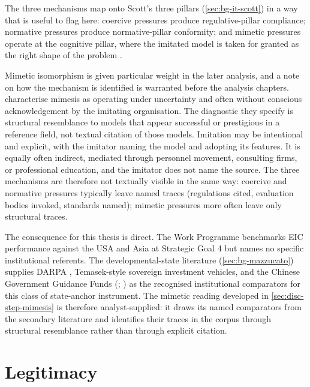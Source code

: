 The three mechanisms map onto Scott's three pillars
(\cref{sec:bg-it-scott}) in a way that is useful to flag here:
coercive pressures produce regulative-pillar compliance; normative
pressures produce normative-pillar conformity; and mimetic pressures
operate at the cognitive pillar, where the imitated model is taken
for granted as the right shape of the problem
\parencite{scott2014institutions}.

Mimetic isomorphism is given particular weight in the later analysis,
and a note on how the mechanism is identified is warranted before the
analysis chapters. \textcite{dimaggio1983iron} characterise mimesis as
operating under uncertainty and often without conscious acknowledgement
by the imitating organisation. The diagnostic they specify is
structural resemblance to models that appear successful or prestigious
in a reference field, not textual citation of those models. Imitation
may be intentional and explicit, with the imitator naming the model
and adopting its features. It is equally often indirect, mediated
through personnel movement, consulting firms, or professional
education, and the imitator does not name the source. The three
mechanisms are therefore not textually visible in the same way:
coercive and normative pressures typically leave named traces
(regulations cited, evaluation bodies invoked, standards named);
mimetic pressures more often leave only structural traces.

The consequence for this thesis is direct. The Work Programme
benchmarks EIC performance against the USA and Asia at Strategic
Goal 4 but names no specific institutional referents. The
developmental-state literature (\cref{sec:bg-mazzucato}) supplies
DARPA \parencite{bonvillian2018darpa}, Temasek-style sovereign
investment vehicles, and the Chinese Government Guidance Funds
(\cite{li2025financing}; \cite{luong2021guidance}) as the recognised
institutional comparators for this class of state-anchor instrument.
The mimetic reading developed in \cref{sec:disc-step-mimesis} is
therefore analyst-supplied: it draws its named comparators from the
secondary literature and identifies their traces in the corpus
through structural resemblance rather than through explicit citation.

\section{Legitimacy}
\label{sec:bg-it-legitimacy}

